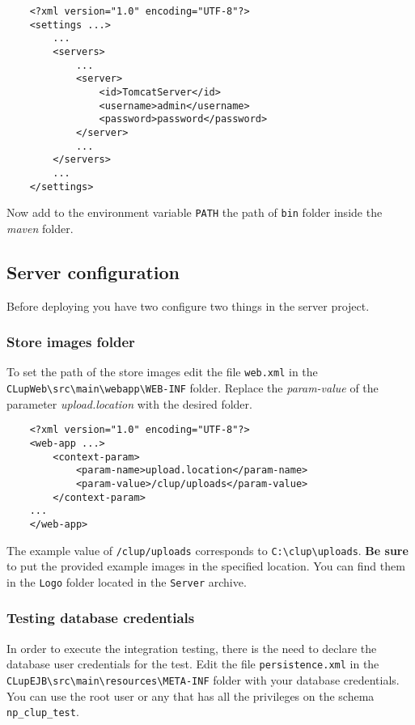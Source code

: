 
\begin{lstlisting}
	<?xml version="1.0" encoding="UTF-8"?>
	<settings ...>
		...
		<servers>
			...
			<server>
				<id>TomcatServer</id>
				<username>admin</username>
				<password>password</password>
			</server>
			...
		</servers>
		...
	</settings>
\end{lstlisting}

Now add to the environment variable \verb|PATH| the path of \verb|bin| folder inside the \textit{maven} folder.

\clearpage

\subsection{Server configuration}
Before deploying you have two configure two things in the server project.

\subsubsection{Store images folder}
To set the path of the store images edit the file \verb|web.xml| in the \verb|CLupWeb\src\main\webapp\WEB-INF| folder.
Replace the \textit{param-value} of the parameter \textit{upload.location} with the desired folder.
\begin{lstlisting}
	<?xml version="1.0" encoding="UTF-8"?>
	<web-app ...>
		<context-param>
			<param-name>upload.location</param-name>
			<param-value>/clup/uploads</param-value>
		</context-param>
	...
	</web-app>
\end{lstlisting}

The example value of \verb|/clup/uploads| corresponds to \verb|C:\clup\uploads|.\newline 
\textbf{Be sure} to put the provided example images in the specified location. You can find them in the \verb|Logo| folder located in the \verb|Server| archive.

\subsubsection{Testing database credentials} 
In order to execute the integration testing, there is the need to declare the database user credentials for the test.\newline 
Edit the file \verb|persistence.xml| in the \verb|CLupEJB\src\main\resources\META-INF| folder with your database credentials.\newline
You can use the root user or any that has all the privileges on the schema \verb|np_clup_test|.

